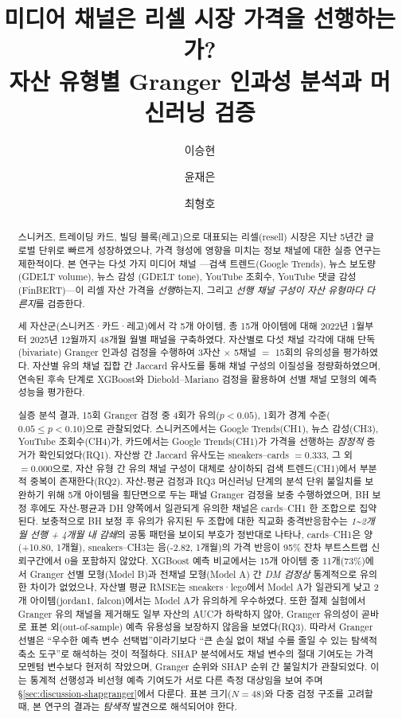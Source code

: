 \documentclass[11pt, a4paper, twocolumn]{article}
\title{미디어 채널은 리셀 시장 가격을 선행하는가? \\
       \large 자산 유형별 Granger 인과성 분석과 머신러닝 검증}
\author{이승현 \and 윤재은 \and 최형호}
\date{}
\begin{document}
\maketitle

\begin{abstract}
\noindent
스니커즈, 트레이딩 카드, 빌딩 블록(레고)으로 대표되는 리셀(resell) 시장은
지난 5년간 글로벌 단위로 빠르게 성장하였으나, 가격 형성에 영향을 미치는
정보 채널에 대한 실증 연구는 제한적이다. 본 연구는 다섯 가지 미디어 채널
---검색 트렌드(Google Trends), 뉴스 보도량(GDELT volume), 뉴스 감성
(GDELT tone), YouTube 조회수, YouTube 댓글 감성(FinBERT)---이 리셀
자산 가격을 \emph{선행}하는지, 그리고 \emph{선행 채널 구성이 자산
유형마다 다른지}를 검증한다.

세 자산군(스니커즈·카드·레고)에서 각 5개 아이템, 총 15개 아이템에 대해
2022년 1월부터 2025년 12월까지 48개월 월별 패널을 구축하였다. 자산별로
다섯 채널 각각에 대해 단독(bivariate) Granger 인과성 검정을 수행하여
3자산 $\times$ 5채널 $=$ 15회의 유의성을 평가하였다. 자산별 유의 채널
집합 간 Jaccard 유사도를 통해 채널 구성의 이질성을 정량화하였으며,
연속된 후속 단계로 XGBoost와 Diebold--Mariano 검정을 활용하여 선별
채널 모형의 예측 성능을 평가한다.

실증 분석 결과, 15회 Granger 검정 중 4회가 유의($p<0.05$), 1회가 경계
수준($0.05\leq p<0.10$)으로 관찰되었다. 스니커즈에서는 Google Trends(CH1),
뉴스 감성(CH3), YouTube 조회수(CH4)가, 카드에서는 Google Trends(CH1)가
가격을 선행하는 \emph{잠정적} 증거가 확인되었다(RQ1). 자산쌍 간 Jaccard
유사도는 sneakers--cards $=0.333$, 그 외 $=0.000$으로, 자산 유형 간
유의 채널 구성이 대체로 상이하되 검색 트렌드(CH1)에서 부분적 중복이
존재한다(RQ2). 자산-평균 검정과 RQ3 머신러닝 단계의 분석 단위 불일치를
보완하기 위해 5개 아이템을 횡단면으로 두는 \citet{dumitrescuhurlin2012}
패널 Granger 검정을 보충 수행하였으며, BH 보정 후에도 자산-평균과 DH
양쪽에서 일관되게 유의한 채널은 cards--CH1 한 조합으로 집약된다. 보충적으로 BH 보정 후 유의가 유지된 두 조합에 대한 직교화
충격반응함수는 \emph{1\textasciitilde2개월 선행 + 4개월 내 감쇄}의
공통 패턴을 보이되 부호가 정반대로 나타나, cards--CH1은 양(+10.80,
1개월), sneakers--CH3는 음(-2.82, 1개월)의 가격 반응이 95\% 잔차 부트스트랩
신뢰구간에서 0을 포함하지 않았다. XGBoost 예측 비교에서는 15개 아이템 중
11개(73\%)에서 Granger 선별 모형(Model B)과 전채널 모형(Model A) 간
\emph{DM 검정상} 통계적으로 유의한 차이가 없었으나, 자산별 평균 RMSE는
sneakers·lego에서 Model A가 일관되게 낮고 2개 아이템(\textsf{jordan1},
\textsf{falcon})에서는 Model A가 유의하게 우수하였다. 또한 절제 실험에서
Granger 유의 채널을 제거해도 일부 자산의 AUC가 하락하지 않아, Granger
유의성이 곧바로 표본 외(out-of-sample) 예측 유용성을 보장하지 않음을
보였다(RQ3). 따라서 Granger 선별은 ``우수한 예측 변수 선택법''이라기보다
``큰 손실 없이 채널 수를 줄일 수 있는 탐색적 축소 도구''로 해석하는 것이
적절하다. SHAP 분석에서도 채널 변수의 절대 기여도는 가격 모멘텀 변수보다
현저히 작았으며, Granger 순위와 SHAP 순위 간 불일치가 관찰되었다. 이는
통계적 선행성과 비선형 예측 기여도가 서로 다른 측정 대상임을 보여 주며
\S\ref{sec:discussion-shapgranger}에서 다룬다.
표본 크기($N=48$)와 다중 검정 구조를 고려할 때, 본 연구의 결과는
\emph{탐색적} 발견으로 해석되어야 한다.


\end{abstract}
\end{document}
